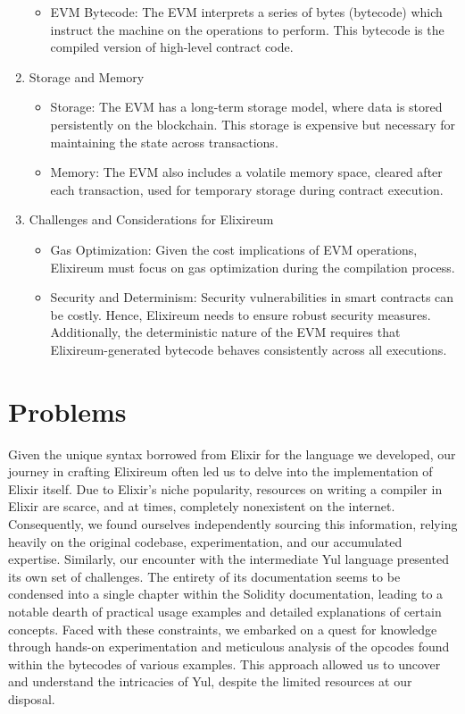 \begin{enumerate}
\begin{itemize}
              \item           EVM Bytecode: The EVM interprets a series of bytes (bytecode) which instruct the machine on the operations to perform. This bytecode is the compiled version of high-level contract code.
          \end{itemize}
    \item Storage and Memory
          \begin{itemize}
              \item   Storage: The EVM has a long-term storage model, where data is stored persistently on the blockchain. This storage is expensive but necessary for maintaining the state across transactions.
              \item         Memory: The EVM also includes a volatile memory space, cleared after each transaction, used for temporary storage during contract execution.
          \end{itemize}
    \item Challenges and Considerations for Elixireum
          \begin{itemize}
              \item Gas Optimization: Given the cost implications of EVM operations, Elixireum must focus on gas optimization during the compilation process.
              \item Security and Determinism: Security vulnerabilities in smart contracts can be costly. Hence, Elixireum needs to ensure robust security measures. Additionally, the deterministic nature of the EVM requires that Elixireum-generated bytecode behaves consistently across all executions.
          \end{itemize}



\end{enumerate}


\section{Problems}
\label{sec:problems}

Given the unique syntax borrowed from Elixir for the language we developed, our journey in crafting Elixireum often led us to delve into the implementation of Elixir itself. Due to Elixir's niche popularity, resources on writing a compiler in Elixir are scarce, and at times, completely nonexistent on the internet. Consequently, we found ourselves independently sourcing this information, relying heavily on the original codebase, experimentation, and our accumulated expertise.
Similarly, our encounter with the intermediate Yul language presented its own set of challenges. The entirety of its documentation seems to be condensed into a single chapter within the Solidity documentation, leading to a notable dearth of practical usage examples and detailed explanations of certain concepts. Faced with these constraints, we embarked on a quest for knowledge through hands-on experimentation and meticulous analysis of the opcodes found within the bytecodes of various examples. This approach allowed us to uncover and understand the intricacies of Yul, despite the limited resources at our disposal.

